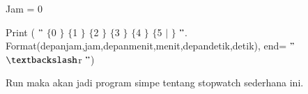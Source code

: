 \documentclass[a4paper,12pt]{report}
\begin{document}
\noindent 
{\fontsize{14pt}{14pt}\selectfont Jam = 0 \\} \par
\noindent 
{\fontsize{14pt}{14pt}\selectfont Print ( $ " $ $  \{  $0 $  \}  $ $  \{  $1 $  \}  $ $  \{  $2 $  \}  $ $  \{  $3 $  \}  $ $  \{  $4 $  \}  $ $  \{  $5 $  \vert  $ $  \}  $ $ " $. Format(depanjam,jam,depanmenit,menit,depandetik,detik), end= $ " $ $  \textbackslash  $r $ " $) \\} \par
\vspace{14pt}
\noindent 
{\fontsize{14pt}{14pt}\selectfont Run maka akan jadi program simpe tentang stopwatch sederhana ini. \\} \par
\end{document}

